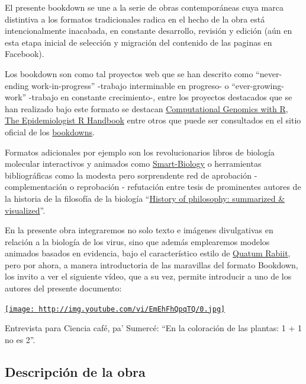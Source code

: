 \documentclass[
  12pt, krantz2,
  spanish,
]{krantz}
\begin{document}
El presente bookdown se une a la serie de obras contemporáneas cuya marca distintiva a los formatos tradicionales radica en el hecho de la obra está intencionalmente inacabada, en constante desarrollo, revisión y edición (aún en esta etapa inicial de selección y migración del contenido de las paginas en Facebook).

Los bookdown son como tal proyectos web que se han descrito como ``never-ending work-in-progress'' -trabajo interminable en progreso- o ``ever-growing-work'' -trabajo en constante crecimiento-, entre los proyectos destacados que se han realizado bajo este formato se destacan \href{https://compgenomr.github.io/book/}{Computational Genomics with R}, \href{https://epirhandbook.com/en/index.html}{The Epidemiologist R Handbook} entre otros que puede ser consultados en el sitio oficial de los \href{https://bookdown.org/home/archive/}{bookdowns}.

Formatos adicionales por ejemplo son los revolucionarios libros de biología molecular interactivos y animados como \href{https://www.smart-biology.com/}{Smart-Biology} o herramientas bibliográficas como la modesta pero sorprendente red de aprobación - complementación o reprobación - refutación entre tesis de prominentes autores de la historia de la filosofía de la biología
``\href{https://www.denizcemonduygu.com/philo/}{History of philosophy: summarized \& visualized}''.

En la presente obra integraremos no solo texto e imágenes divulgativas en relación a la biología de los virus, sino que además emplearemos modelos animados basados en evidencia, bajo el característico estilo de \href{https://www.facebook.com/Medicina88}{Quatum Rabiit}, pero por ahora, a manera introductoria de las maravillas del formato Bookdown, los invito a ver el siguiente vídeo, que a su vez, permite introducir a uno de los autores del presente documento:

\href{http://www.youtube.com/watch?v=EmEhFhQpqTQ}{\texttt{[image: http://img.youtube.com/vi/EmEhFhQpqTQ/0.jpg]}}

Entrevista para Ciencia café, pa' Sumercé: ``En la coloración de las plantas: 1 + 1 no es 2''.

\hypertarget{descripciuxf3n-de-la-obra}{%
\subsection*{Descripción de la obra}\label{descripciuxf3n-de-la-obra}}
\end{document}
